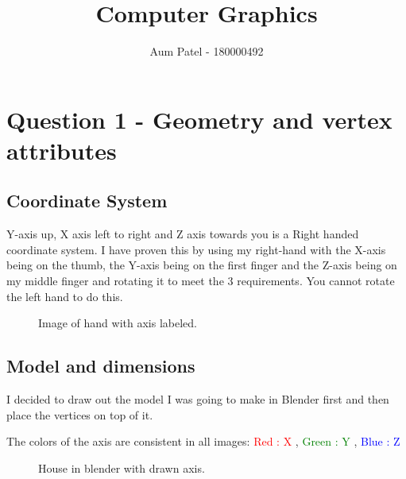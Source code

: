 \documentclass[10pt]{report}
\begin{document}
\author{Aum Patel - 180000492}
\title{Computer Graphics}
\maketitle


\tableofcontents

\chapter{Question 1 - Geometry and vertex attributes}

\section{Coordinate System}
Y-axis up, X axis left to right and Z axis towards you is a Right handed coordinate system. I have proven this by using my right-hand with the X-axis being on the thumb, the Y-axis being on the first finger and the Z-axis being on my middle finger and rotating it to meet the 3 requirements. You cannot rotate the left hand to do this.

\begin{figure}[H]
    \centering
    \caption{Image of hand with axis labeled.}
\end{figure}

\section{Model and dimensions}
I decided to draw out the model I was going to make in Blender first and then place the vertices on top of it. 

The colors of the axis are consistent in all images: \textcolor{red}{Red : X} , \textcolor{green}{Green : Y} , \textcolor{blue}{Blue : Z}

\begin{figure}[H]
    \centering
    \caption{House in blender with drawn axis.}
\end{figure}
\end{document}
